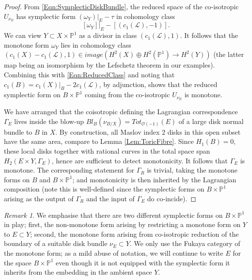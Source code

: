 \documentclass[reqno,10pt]{amsart}
\numberwithin{equation}{section}
\newcommand{\bP}{{\mathbb P}}
\theoremstyle{remark}
\newtheorem{Remark}[thm]{Remark}
\begin{document}
\begin{proof}
From \eqref{Eqn:SymplecticDiskBundle}, the reduced space of the co-isotropic $U_{\nu_E}$  has symplectic form $(\omega_Y)|_E - \tau$ in cohomology class
\begin{equation} \label{Eqn:ReducedClass}
[\omega_Y]|_E - [(c_1(\mathcal{L}), -1)].
\end{equation}
We can view $Y\subset X\times \bP^1$ as a divisor in class $(c_1(\mathcal{L}),1)$. It follows that the monotone form $\omega_Y$ lies in cohomology class $(c_1(X) - c_1(\mathcal{L}), 1) \in image \left( H^2(X) \oplus H^2(\bP^1) \rightarrow H^2(Y) \right)$ (the latter map being an isomorphism by the Lefschetz theorem in our examples).  Combining this with \eqref{Eqn:ReducedClass} and noting that $c_1(B) = c_1(X)|_B -2c_1(\mathcal{L})$, by adjunction, shows that the reduced symplectic form on $B\times \bP^1$ coming from the co-isotropic $U_{\nu_E}$ is monotone.     

We have arranged that the coisotropic defining the Lagrangian correspondence $\Gamma_E$ lives inside the blow-up $Bl_B(\nu_{B/X}) = Tot_{\mathcal{O}(-1)}(E)$ of a large disk normal bundle to $B$ in $X$. By construction, all Maslov index 2 disks in this open subset have the same area, compare to Lemma \ref{Lem:ToricFibre}.  Since $H_1(B) = 0$, these local disks together with rational curves in the total space span $H_2(E\times Y, \Gamma_E)$, hence are sufficient to detect monotonicity. It follows that $\Gamma_E$ is monotone.  The corresponding statement for $\Gamma_R$ is trivial, taking the monotone forms on $B$ and $B \times \bP^1$; and monotonicity is then inherited by the Lagrangian composition (note this  is well-defined since the symplectic forms on $B\times \bP^1$ arising as the output of $\Gamma_R$ and the input of $\Gamma_E$ do co-incide).
\end{proof}

\begin{Remark} \label{Rem:MonotoneFormFromCut}
We emphasise that there are two different symplectic forms on $B\times \bP^1$ in play;  first, the non-monotone  form arising by restricting a  monotone form on $Y$ to $E\subset Y$; second, the monotone form arising from co-isotropic reduction of the boundary of a suitable disk bundle $\nu_E \subset Y$.  We only use the Fukaya category of the monotone form; as a mild abuse of notation, we will continue to write $E$ for the space $B\times \bP^1$ even though it is not equipped with the symplectic form it inherits from the embedding in the ambient space $Y$.
\end{Remark}
\end{document}
